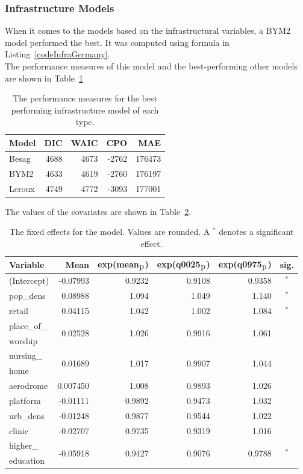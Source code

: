 \subsubsection{Infrastructure Models}\label{sssec:infraGermany}
When it comes to the models based on the infrastructural variables, a BYM2 model performed the best. It was computed using formula in Listing~\ref{codeInfraGermany}. \\
The performance measures of this model and the best-performing other models are shown in Table~\ref{infraGermany}
\begin{table}[H] 
\caption{The performance measures for the best performing infrastructure model of each type. \label{infraGermany}}
\begin{tabular}{l r r r r}
\toprule
\textbf{Model}	& \textbf{DIC}	& \textbf{WAIC} & \textbf{CPO} & \textbf{MAE}\\
\midrule
Besag & 4688 & 4673 & -2762 & 176473\\
BYM2 & 4633 & 4619 & -2760 & 176197\\
Leroux & 4749 & 4772 & -3093 & 177001\\
\bottomrule
\end{tabular}
\end{table}
The values of the covariates are shown in Table~\ref{FixedInfraGermany_spatial}.
\begin{table}[H]
\caption{The fixed effects for the model. Values are rounded. A $^*$ denotes a significant effect. \label{FixedInfraGermany_spatial}}
\begin{tabular}{l r r r r c}
\toprule
\textbf{Variable}	& \textbf{Mean}	& \textbf{exp(mean$_{\hbox{p}}$)} & \textbf{exp(q0025$_{\hbox{p}}$)} & \textbf{exp(q0975$_{\hbox{p}}$)} & \textbf{sig.}\\
\midrule
(Intercept) & -0.07993 & 0.9232 & 0.9108 & 0.9358 & $^*$\\
pop\_dens & 0.08988 & 1.094 & 1.049 & 1.140 & $^*$\\
retail & 0.04115 & 1.042 & 1.002 & 1.084 & $^*$\\
place\_of\_ & \multirow{2}{*}{0.02528} & \multirow{2}{*}{1.026} & \multirow{2}{*}{0.9916} & \multirow{2}{*}{1.061}\\
worship\\
nursing\_ & \multirow{2}{*}{0.01689} & \multirow{2}{*}{1.017} & \multirow{2}{*}{0.9907} & \multirow{2}{*}{1.044} \\
home\\
aerodrome & 0.007450 & 1.008 & 0.9893 & 1.026 \\
platform & -0.01111 & 0.9892 & 0.9473 & 1.032 \\
urb\_dens & -0.01248 & 0.9877 & 0.9544 & 1.022 \\
clinic & -0.02707 & 0.9735 & 0.9319 & 1.016  \\
higher\_ & \multirow{2}{*}{-0.05918} & \multirow{2}{*}{0.9427} & \multirow{2}{*}{0.9076} & \multirow{2}{*}{0.9788} & \multirow{2}{*}{$^*$} \\
education\\
\bottomrule
\end{tabular}
\end{table}
